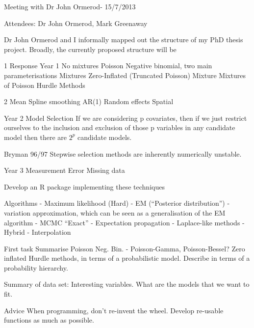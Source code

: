 \documentclass{amsart}
\begin{document}
Meeting with Dr John Ormerod- 15/7/2013

Attendees: Dr John Ormerod, Mark Greenaway

Dr John Ormerod and I informally mapped out the structure of my PhD thesis project. Broadly, the currently proposed structure will
be

1 Response
Year 1
	No mixtures
		Poisson
		Negative binomial, two main parameterisations
	Mixtures
		Zero-Inflated (Truncated Poisson) Mixture
		Mixtures of Poisson
		Hurdle Methods

2 Mean
Spline smoothing
AR(1)
Random effects
Spatial

Year 2
Model Selection
If we are considering p covariates, then if we just restrict ourselves to the inclusion and exclusion of those
p variables in any candidate model then there are $2^p$ candidate models.

Bryman 96/97 Stepwise selection methods are inherently numerically unstable.

Year 3
Measurement Error
Missing data

Develop an R package implementing these techniques

Algorithms
- Maximum likelihood (Hard)
- EM (``Posterior distribution'')
- variation approximation, which can be seen as a generalisation of the EM algorithm
- MCMC ``Exact''
- Expectation propagation
- Laplace-like methods
- Hybrid
- Interpolation

First task
Summarise Poisson
Neg. Bin. - Poisson-Gamma, Poisson-Bessel?
Zero inflated
Hurdle methods, in terms of a probabilistic model. Describe in terms of a probability hierarchy.

Summary of data set: Interesting variables. What are the models that we want to fit.

Advice
When programming, don't re-invent the wheel. Develop re-usable functions as much as possible.
\end{document}
